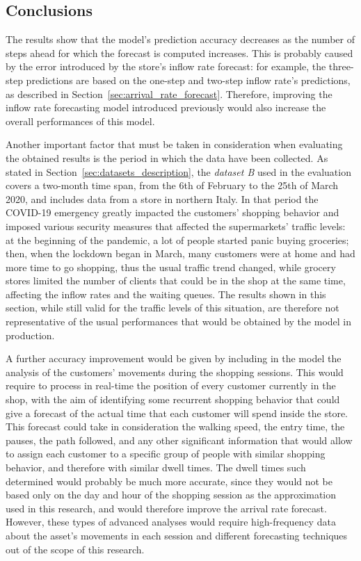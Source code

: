 \subsection{Conclusions}
\label{subsec:arrival_rate_forecast_results_conclusions}

The results show that the model’s prediction accuracy decreases as the number of steps ahead for which the forecast is computed increases. This is probably caused by the error introduced by the store’s inflow rate forecast: for example, the three-step predictions are based on the one-step and two-step inflow rate’s predictions, as described in Section~\ref{sec:arrival_rate_forecast}. Therefore, improving the inflow rate forecasting model introduced previously would also increase the overall performances of this model.

Another important factor that must be taken in consideration when evaluating the obtained results is the period in which the data have been collected. As stated in Section~\ref{sec:datasets_description}, the \emph{dataset B} used in the evaluation covers a two-month time span, from the 6th of February to the 25th of March 2020, and includes data from a store in northern Italy. In that period the COVID-19 emergency greatly impacted the customers' shopping behavior and imposed various security measures that affected the supermarkets' traffic levels: at the beginning of the pandemic, a lot of people started panic buying groceries; then, when the lockdown began in March, many customers were at home and had more time to go shopping, thus the usual traffic trend changed, while grocery stores limited the number of clients that could be in the shop at the same time, affecting the inflow rates and the waiting queues. The results shown in this section, while still valid for the traffic levels of this situation, are therefore not representative of the usual performances that would be obtained by the model in production.

A further accuracy improvement would be given by including in the model the analysis of the customers’ movements during the shopping sessions. This would require to process in real-time the position of every customer currently in the shop, with the aim of identifying some recurrent shopping behavior that could give a forecast of the actual time that each customer will spend inside the store. This forecast could take in consideration the walking speed, the entry time, the pauses, the path followed, and any other significant information that would allow to assign each customer to a specific group of people with similar shopping behavior, and therefore with similar dwell times. The dwell times such determined would probably be much more accurate, since they would not be based only on the day and hour of the shopping session as the approximation used in this research, and would therefore improve the arrival rate forecast. However, these types of advanced analyses would require high-frequency data about the asset’s movements in each session and different forecasting techniques out of the scope of this research.

